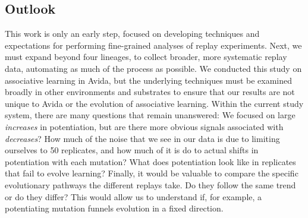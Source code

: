 
\subsection{Outlook}
This work is only an early step, focused on developing techniques and expectations for performing fine-grained analyses of replay experiments. 
Next, we must expand beyond four lineages, to collect broader, more systematic replay data, automating as much of the process as possible.
We conducted this study on associative learning in Avida, but the underlying techniques must be examined broadly in other environments and substrates to ensure that our results are not unique to Avida or the evolution of associative learning. %
Within the current study system, there are many questions that remain unanswered: 
We focused on large \textit{increases} in potentiation, but are there more obvious signals associated with \textit{decreases}?
How much of the noise that we see in our data is due to limiting ourselves to 50 replicates, and how much of it is do to actual shifts in potentiation with each mutation? %
What does potentiation look like in replicates that fail to evolve learning? %
Finally, it would be valuable to compare the specific evolutionary pathways the different replays take. Do they follow the same trend or do they differ?  This would allow us to understand if, for example, a potentiating mutation funnels evolution in a fixed direction.

